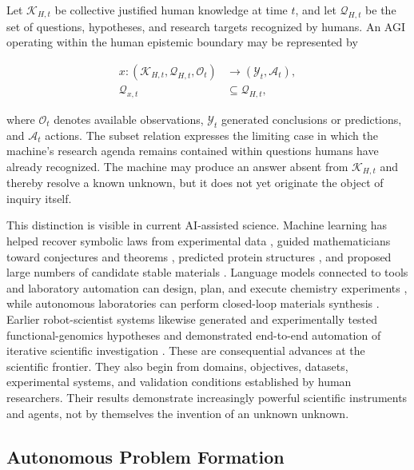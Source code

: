 Let $\mathcal{K}_{H,t}$ be collective justified human knowledge at time $t$,
and let $\mathcal{Q}_{H,t}$ be the set of questions, hypotheses, and research
targets recognized by humans. An AGI operating within the human epistemic
boundary may be represented by

\begin{equation}
\begin{aligned}
x:
(\mathcal{K}_{H,t},\mathcal{Q}_{H,t},\mathcal{O}_{t})
&\longrightarrow
(\mathcal{Y}_{t},\mathcal{A}_{t}),\\
\mathcal{Q}_{x,t}
&\subseteq \mathcal{Q}_{H,t},
\end{aligned}
\label{eq:agi_epistemic_boundary}
\end{equation}

where $\mathcal{O}_{t}$ denotes available observations,
$\mathcal{Y}_{t}$ generated conclusions or predictions, and
$\mathcal{A}_{t}$ actions. The subset relation expresses the limiting case in
which the machine's research agenda remains contained within questions humans
have already recognized. The machine may produce an answer absent from
$\mathcal{K}_{H,t}$ and thereby resolve a known unknown, but it does not yet
originate the object of inquiry itself.

This distinction is visible in current AI-assisted science. Machine learning
has helped recover symbolic laws from experimental data
\cite{schmidt2009laws,udrescu2020aifeynman}, guided
mathematicians toward conjectures and theorems \cite{davies2021mathematics},
predicted protein structures \cite{jumper2021alphafold}, and proposed large
numbers of candidate stable materials \cite{merchant2023materials}. Language
models connected to tools and laboratory automation can design, plan, and
execute chemistry experiments \cite{boiko2023autonomous}, while autonomous
laboratories can perform closed-loop materials synthesis
\cite{szymanski2023autonomous}. Earlier robot-scientist systems likewise
generated and experimentally tested functional-genomics hypotheses
\cite{king2004robot} and demonstrated end-to-end automation of iterative
scientific investigation \cite{king2009automation}. These are consequential advances at the
scientific frontier. They also begin from domains, objectives, datasets,
experimental systems, and validation conditions established by human
researchers. Their results demonstrate increasingly powerful scientific
instruments and agents, not by themselves the invention of an unknown unknown.

\subsection{\textbf{Autonomous Problem Formation}}

